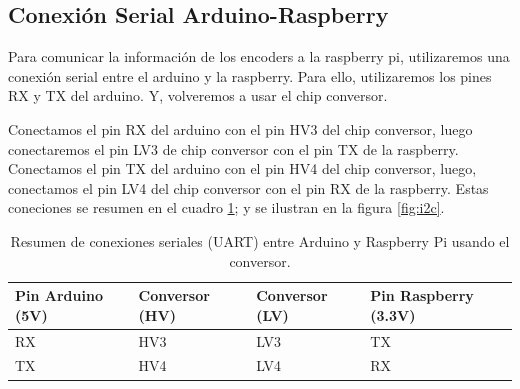 \subsection{Conexión Serial Arduino-Raspberry}

Para comunicar la información de los encoders a la raspberry pi, utilizaremos una conexión serial entre el arduino y la raspberry. Para ello, utilizaremos los pines RX y TX del arduino. Y, volveremos a usar el chip conversor. 

Conectamos el pin RX del arduino con el pin HV3 del chip conversor, luego conectaremos el pin LV3 de chip conversor con el pin TX de la raspberry. Conectamos el pin TX del arduino con el pin HV4 del chip conversor, luego, conectamos el pin LV4 del chip conversor con el pin RX de la raspberry. Estas coneciones se resumen en el cuadro \ref{tab:cserial}; y se ilustran en la figura \ref{fig:i2c}.

\begin{table}[htpb]
    \centering
    \renewcommand{\arraystretch}{1.3}
    \begin{tabular}{@{}llll@{}}
        \toprule
        \textbf{Pin Arduino (5V)} & \textbf{Conversor (HV)} & \textbf{Conversor (LV)} & \textbf{Pin Raspberry (3.3V)} \\
        \midrule
        RX & HV3 & LV3 & TX \\
        TX & HV4 & LV4 & RX \\
        \bottomrule
    \end{tabular}
    \caption{Resumen de conexiones seriales (UART) entre Arduino y Raspberry Pi usando el conversor.}
    \label{tab:cserial}
\end{table}

